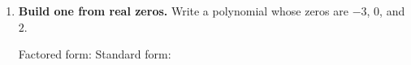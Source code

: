 \documentclass[10pt]{article}
\begin{document}
\begin{tcolorbox}[colback=white, colframe=black!40, title=\textbf{Tier R --- Remediate},
    fonttitle=\bfseries, arc=1.5mm, left=3mm, right=3mm, top=2mm, bottom=2mm, breakable]
\begin{enumerate}[leftmargin=1.7em, itemsep=9pt]
    \vspace{2pt}
    Depressed polynomial: \blank{2.6cm} \; Solve it: $x = $ \blank{2.4cm}

    \vspace{2pt}
    Completely factored: \blank{4.2cm} \qquad All solutions: \blank{3.6cm}

    \vspace{2pt}
    Number and type: \blank{1.0cm} real, \blank{1.0cm} imaginary. Total \blank{1.0cm} $=$ degree
    \blank{1.0cm}. \checkmark

  \item \textbf{Build one from real zeros.} Write a polynomial whose zeros are $-3$, $0$, and $2$.

    \vspace{2pt}
    Factored form: \blank{4.2cm} \qquad Standard form: \blank{4.6cm}
\end{enumerate}
\end{tcolorbox}
\end{document}
